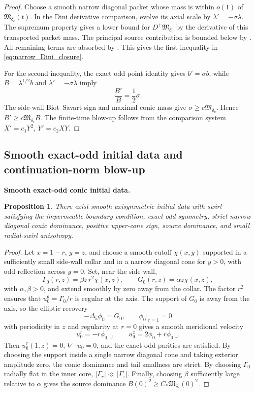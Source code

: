 \documentclass[11pt]{amsart}
\newtheorem{proposition}[theorem]{Proposition}
\begin{document}
\begin{proof}
Choose a smooth narrow diagonal packet whose mass is within \(o(1)\) of \(\mathfrak M_{\delta_c}(t)\).  In the Dini derivative comparison, evolve its axial scale by \(\lambda'=-\sigma\lambda\).  The supremum property gives a lower bound for \(D^+\mathfrak M_{\delta_c}\) by the derivative of this transported packet mass.  The principal source contribution is bounded below by .  All remaining terms are absorbed by .  This gives the first inequality in \eqref{eq:narrow_Dini_closure}.

For the second inequality, the exact odd point identity gives \(b'=\sigma b\), while \(B=\lambda^{1/2}b\) and \(\lambda'=-\sigma\lambda\) imply
\[
\frac{B'}B=\frac12\sigma.
\]
The side-wall Biot--Savart sign and maximal conic mass give \(\sigma\ge c\mathfrak M_{\delta_c}\).  Hence \(B'\ge c\mathfrak M_{\delta_c}B\).  The finite-time blow-up follows from the comparison system \(X'=c_1Y^2\), \(Y'=c_2XY\).
\end{proof}

\subsection{Smooth exact-odd initial data and continuation-norm blow-up}

\medskip
\noindent\textbf{Smooth exact-odd conic initial data.}
\begin{proposition}\label{prop:smooth_odd_initial_data}
There exist smooth axisymmetric initial data with swirl satisfying the impermeable boundary condition, exact odd symmetry, strict narrow diagonal conic dominance, positive upper-cone sign, source dominance, and small radial-swirl anisotropy.
\end{proposition}

\begin{proof}
Let \(x=1-r\), \(y=z\), and choose a smooth cutoff \(\chi(x,y)\) supported in a sufficiently small side-wall collar and in a narrow diagonal cone for \(y>0\), with odd reflection across \(y=0\).  Set, near the side wall,
\[
\Gamma_0(r,z)=\beta z\,r^2\chi(x,z),
\qquad
G_0(r,z)=\alpha z\chi(x,z),
\]
with \(\alpha,\beta>0\), and extend smoothly by zero away from the collar.  The factor \(r^2\) ensures that \(u_0^\theta=\Gamma_0/r\) is regular at the axis.  The support of \(G_0\) is away from the axis, so the elliptic recovery
\[
-\Delta_5\phi_0=G_0,
\qquad
\phi_0|_{r=1}=0
\]
with periodicity in \(z\) and regularity at \(r=0\) gives a smooth meridional velocity
\[
u_0^r=-r\phi_{0,z},
\qquad
u_0^z=2\phi_0+r\phi_{0,r}.
\]
Then \(u_0^r(1,z)=0\), \(\nabla\cdot u_0=0\), and the exact odd parities are satisfied.  By choosing the support inside a single narrow diagonal cone and taking exterior amplitude zero, the conic dominance and tail smallness are strict.  By choosing \(\Gamma_0\) radially flat in the inner core, \(|\Gamma_r|\ll |\Gamma_z|\).  Finally, choosing \(\beta\) sufficiently large relative to \(\alpha\) gives the source dominance \(B(0)^2\ge C_*\mathfrak M_{\delta_c}(0)^2\).
\end{proof}
\end{document}
